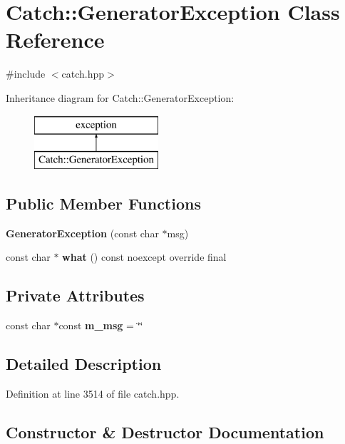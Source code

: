 \section{Catch\+::Generator\+Exception Class Reference}
\label{class_catch_1_1_generator_exception}


{\ttfamily \#include $<$catch.\+hpp$>$}

Inheritance diagram for Catch\+::Generator\+Exception\+:\begin{figure}[H]
\begin{center}
\leavevmode
\includegraphics[height=2.000000cm]{class_catch_1_1_generator_exception}
\end{center}
\end{figure}
\subsection*{Public Member Functions}
\begin{DoxyCompactItemize}
\item 
\textbf{ Generator\+Exception} (const char $\ast$msg)
\item 
const char $\ast$ \textbf{ what} () const noexcept override final
\end{DoxyCompactItemize}
\subsection*{Private Attributes}
\begin{DoxyCompactItemize}
\item 
const char $\ast$const \textbf{ m\+\_\+msg} = \char`\"{}\char`\"{}
\end{DoxyCompactItemize}


\subsection{Detailed Description}


Definition at line 3514 of file catch.\+hpp.



\subsection{Constructor \& Destructor Documentation}
\mbox{\label{class_catch_1_1_generator_exception_a3cf9282d555ec32389665ce723bf36ea}} 
